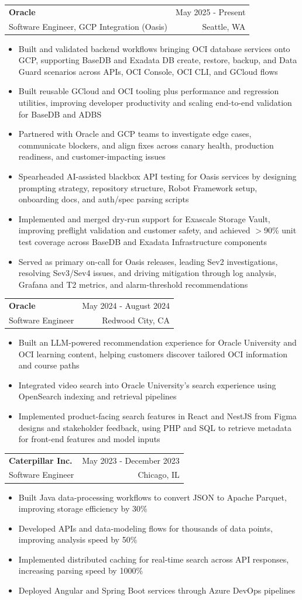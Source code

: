 \documentclass[letterpaper,11pt]{article}
\makeatletter
\newcommand{\resumeItem}[1]{
  \item\small{
    {#1 \vspace{-2pt}}
  }
}
\newcommand{\resumeSubheading}[4]{
  \vspace{-2pt}\item
    \begin{tabular*}{0.97\textwidth}[t]{l@{\extracolsep{\fill}}r}
      \textbf{#1} & #2 \\
      {\small#3} & {\small #4} \\
    \end{tabular*}\vspace{-7pt}
}
\newcommand{\resumeItemListStart}{\begin{itemize}}
\newcommand{\resumeItemListEnd}{\end{itemize}\vspace{-5pt}}
\makeatother
\begin{document}
    \resumeSubheading
  {Oracle}{May 2025 - Present}
  {Software Engineer, GCP Integration (Oasis)}{Seattle, WA}
  \resumeItemListStart
    \resumeItem{Built and validated backend workflows bringing OCI database services onto GCP, supporting BaseDB and Exadata DB create, restore, backup, and Data Guard scenarios across APIs, OCI Console, OCI CLI, and GCloud flows}
    \resumeItem{Built reusable GCloud and OCI tooling plus performance and regression utilities, improving developer productivity and scaling end-to-end validation for BaseDB and ADBS}
    \resumeItem{Partnered with Oracle and GCP teams to investigate edge cases, communicate blockers, and align fixes across canary health, production readiness, and customer-impacting issues}
    \resumeItem{Spearheaded AI-assisted blackbox API testing for Oasis services by designing prompting strategy, repository structure, Robot Framework setup, onboarding docs, and auth/spec parsing scripts}
    \resumeItem{Implemented and merged dry-run support for Exascale Storage Vault, improving preflight validation and customer safety, and achieved $>$90\% unit test coverage across BaseDB and Exadata Infrastructure components}
    \resumeItem{Served as primary on-call for Oasis releases, leading Sev2 investigations, resolving Sev3/Sev4 issues, and driving mitigation through log analysis, Grafana and T2 metrics, and alarm-threshold recommendations}
  \resumeItemListEnd

    \resumeSubheading
      {Oracle}{May 2024 - August 2024}
      {Software Engineer}{Redwood City, CA}
      \resumeItemListStart
        \resumeItem{Built an LLM-powered recommendation experience for Oracle University and OCI learning content, helping customers discover tailored OCI information and course paths}
        \resumeItem{Integrated video search into Oracle University's search experience using OpenSearch indexing and retrieval pipelines}
        \resumeItem{Implemented product-facing search features in React and NestJS from Figma designs and stakeholder feedback, using PHP and SQL to retrieve metadata for front-end features and model inputs}
      \resumeItemListEnd

    \resumeSubheading
      {Caterpillar Inc.}{May 2023 - December 2023}
      {Software Engineer}{Chicago, IL}
      \resumeItemListStart
        \resumeItem{Built Java data-processing workflows to convert JSON to Apache Parquet, improving storage efficiency by 30\%}
        \resumeItem{Developed APIs and data-modeling flows for thousands of data points, improving analysis speed by 50\%}
        \resumeItem{Implemented distributed caching for real-time search across API responses, increasing parsing speed by 1000\%}
        \resumeItem{Deployed Angular and Spring Boot services through Azure DevOps pipelines}
      \resumeItemListEnd
\end{document}
